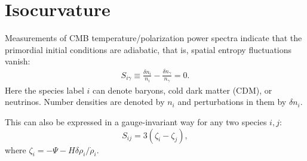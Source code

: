 \section{Isocurvature}
Measurements of CMB temperature/polarization power spectra indicate that the primordial initial conditions are adiabatic, that is, spatial entropy fluctuations vanish:
\begin{align}
S_{i \gamma}\equiv \frac{\delta n_{i}}{n_{i}}-\frac{\delta n_{\gamma}}{n_{\gamma}} =0.
\end{align}
Here the species label $i$ can denote baryons, cold dark matter (CDM), or neutrinos. Number densities are denoted by $n_{i}$ and perturbations in them by $\delta n_{i}$.

This can also be expressed in a gauge-invariant way for any two species $i,j$:
\begin{equation}
S_{ij}=3(\zeta_i-\zeta_j),
\end{equation}
where $\zeta_i = -\Psi - H \delta\rho_i/\dot{\rho}_i$.

